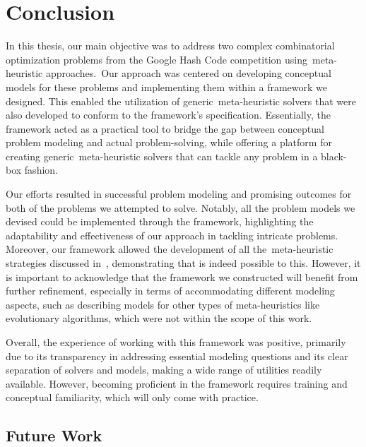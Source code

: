 \chapter{Conclusion}
\label{ch:conclusion}


In this thesis, our main objective was to address two complex combinatorial
optimization problems from the Google Hash Code competition using~\acrshort{meta-heuristic}
approaches.~Our approach was centered on developing conceptual models for these
problems and implementing them within a framework we designed. This enabled the
utilization of generic~\acrshort{meta-heuristic} solvers that were also developed to
conform to the framework's specification. Essentially, the framework acted as a
practical tool to bridge the gap between conceptual problem modeling and actual
problem-solving, while offering a platform for creating generic~\acrshort{meta-heuristic}
solvers that can tackle any problem in a black-box fashion.

Our efforts resulted in successful problem modeling and promising outcomes for
both of the problems we attempted to solve. Notably, all the problem models we
devised could be implemented through the framework, highlighting the
adaptability and effectiveness of our approach in tackling intricate problems.
Moreover, our framework allowed the development of all the~\acrshort{meta-heuristic}
strategies discussed in~, demonstrating that is indeed
possible to this. However, it is important to acknowledge that the framework we
constructed will benefit from further refinement, especially in terms of
accommodating different modeling aspects, such as describing models for other
types of meta-heuristics like evolutionary algorithms, which were not within the
scope of this work.

Overall, the experience of working with this framework was positive, primarily
due to its transparency in addressing essential modeling questions and its clear
separation of solvers and models, making a wide range of utilities readily
available. However, becoming proficient in the framework requires
training and conceptual familiarity, which will only come with practice.

\section{Future Work}

